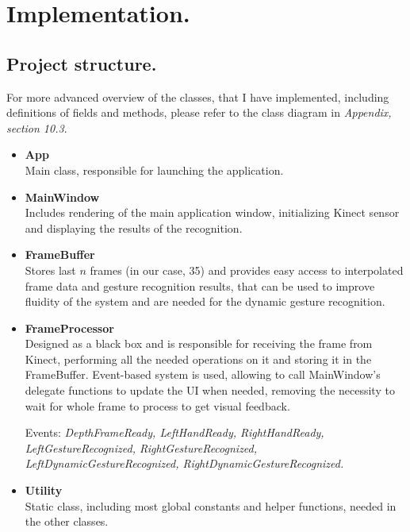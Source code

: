 \documentclass[a4paper,11pt,oneside]{article}
\begin{document}
\section{Implementation.}

\subsection{Project structure.}

For more advanced overview of the classes, that I have implemented, including definitions of fields and methods, please refer to the class diagram in \textit{Appendix, section 10.3}.\\

\begin{itemize}

\item \textbf{App}\\
Main class, responsible for launching the application.

\item \textbf{MainWindow}\\
Includes rendering of the main application window, initializing Kinect sensor and displaying the results of the recognition.

\item \textbf{FrameBuffer}\\
Stores last $n$ frames (in our case, 35) and provides easy access to interpolated frame data and gesture recognition results, that can be used to improve fluidity of the system and are needed for the dynamic gesture recognition.

\item \textbf{FrameProcessor}\\
Designed as a black box and is responsible for receiving the frame from Kinect, performing all the needed operations on it and storing it in the FrameBuffer. Event-based system is used, allowing to call MainWindow's delegate functions to update the UI when needed, removing the necessity to wait for whole frame to process to get visual feedback.

Events: \textit{DepthFrameReady, LeftHandReady, RightHandReady, LeftGestureRecognized, RightGestureRecognized, LeftDynamicGestureRecognized, RightDynamicGestureRecognized.}

\item \textbf{Utility}\\
Static class, including most global constants and helper functions, needed in the other classes.


\end{itemize}
\end{document}
